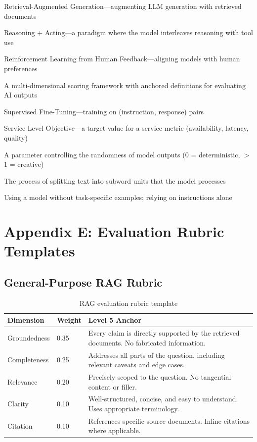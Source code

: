 \begin{description}[leftmargin=1.5cm, labelwidth=1.3cm]
    \item[RAG] Retrieval-Augmented Generation---augmenting LLM generation with retrieved documents
    \item[ReAct] Reasoning + Acting---a paradigm where the model interleaves reasoning with tool use
    \item[RLHF] Reinforcement Learning from Human Feedback---aligning models with human preferences
    \item[Rubric] A multi-dimensional scoring framework with anchored definitions for evaluating AI outputs
    \item[SFT] Supervised Fine-Tuning---training on (instruction, response) pairs
    \item[SLO] Service Level Objective---a target value for a service metric (availability, latency, quality)
    \item[Temperature] A parameter controlling the randomness of model outputs (0 = deterministic, $>$1 = creative)
    \item[Tokenization] The process of splitting text into subword units that the model processes
    \item[Zero-Shot] Using a model without task-specific examples; relying on instructions alone
\end{description}


\section{Appendix E: Evaluation Rubric Templates}

\subsection{General-Purpose RAG Rubric}

\begin{table}[htbp]
\centering
\caption{RAG evaluation rubric template}
\label{tab:rag-rubric}
\begin{tabularx}{\textwidth}{p{2cm}p{1cm}X}
\toprule
\textbf{Dimension} & \textbf{Weight} & \textbf{Level 5 Anchor} \\
\midrule
Groundedness & 0.35 & Every claim is directly supported by the retrieved documents. No fabricated information. \\
Completeness & 0.25 & Addresses all parts of the question, including relevant caveats and edge cases. \\
Relevance & 0.20 & Precisely scoped to the question. No tangential content or filler. \\
Clarity & 0.10 & Well-structured, concise, and easy to understand. Uses appropriate terminology. \\
Citation & 0.10 & References specific source documents. Inline citations where applicable. \\
\bottomrule
\end{tabularx}
\end{table}

